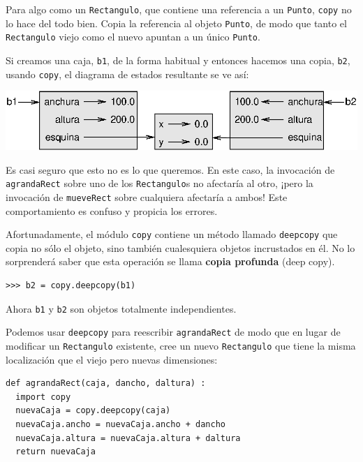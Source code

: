 Para algo como un \texttt{Rectangulo}, que contiene una referencia
a un \texttt{Punto}, \texttt{copy} no lo hace del todo bien. Copia
la referencia al objeto \texttt{Punto}, de modo que tanto el \texttt{Rectangulo}
viejo como el nuevo apuntan a un único \texttt{Punto}.

Si creamos una caja, \texttt{b1}, de la forma habitual y entonces
hacemos una copia, \texttt{b2}, usando \texttt{copy}, el diagrama
de estados resultante se ve así:

\beforefig \centerline{\includegraphics{illustrations/rectangle2}}
\afterfig

Es casi seguro que esto no es lo que queremos. En este caso, la invocación
de \texttt{agrandaRect} sobre uno de los \texttt{Rectangulo}s no afectaría
al otro, ¡pero la invocación de \texttt{mueveRect} sobre cualquiera
afectaría a ambos! Este comportamiento es confuso y propicia los errores.

Afortunadamente, el módulo \texttt{copy} contiene un método llamado
\texttt{deepcopy} que copia no sólo el objeto, sino también cualesquiera
objetos incrustados en él. No lo sorprenderá saber que esta operación
se llama \textbf{copia profunda} (deep copy).

\begin{verbatim}
>>> b2 = copy.deepcopy(b1)
\end{verbatim}
 Ahora \texttt{b1} y \texttt{b2} son objetos totalmente independientes.

Podemos usar \texttt{deepcopy} para reescribir \texttt{agrandaRect}
de modo que en lugar de modificar un \texttt{Rectangulo} existente,
cree un nuevo \texttt{Rectangulo} que tiene la misma localización
que el viejo pero nuevas dimensiones:

\begin{verbatim}
def agrandaRect(caja, dancho, daltura) :
  import copy
  nuevaCaja = copy.deepcopy(caja)
  nuevaCaja.ancho = nuevaCaja.ancho + dancho
  nuevaCaja.altura = nuevaCaja.altura + daltura
  return nuevaCaja
\end{verbatim}
 

